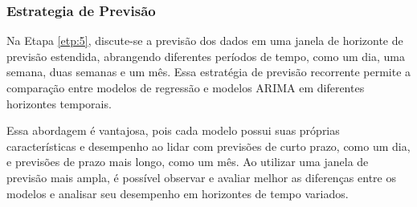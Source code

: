 \subsubsection{Estrategia de Previs\~ao}\label{subsubsec:est}

Na Etapa \ref{etp:5}, discute-se a previsão dos dados em uma janela de horizonte de previsão estendida, abrangendo diferentes períodos de tempo, como um dia, uma semana, duas semanas e um mês. Essa estratégia de previsão recorrente permite a comparação entre modelos de regressão e modelos ARIMA em diferentes horizontes temporais.

Essa abordagem é vantajosa, pois cada modelo possui suas próprias características e desempenho ao lidar com previsões de curto prazo, como um dia, e previsões de prazo mais longo, como um mês. Ao utilizar uma janela de previsão mais ampla, é possível observar e avaliar melhor as diferenças entre os modelos e analisar seu desempenho em horizontes de tempo variados.